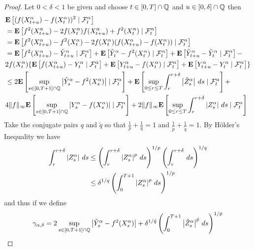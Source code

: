 \begin{proof}
Let $0 < \delta < 1$ be given and choose $t \in [0,T] \cap \rationals$ and $u \in [0,\delta] \cap \rationals$ then
\begin{align*}
&\cexpectationlong{\mathcal{F}^\alpha_t}{(f(X^\alpha_{t+u}) - f(X^\alpha_t))^2} \\
&=\cexpectationlong{\mathcal{F}^\alpha_t}{f^2(X^\alpha_{t+u}) -2 f(X^\alpha_t) f(X^\alpha_{t+u}) + f^2(X^\alpha_t)} \\
&=\cexpectationlong{\mathcal{F}^\alpha_t}{f^2(X^\alpha_{t+u}) - f^2(X^\alpha_t) -2 f(X^\alpha_t) (f(X^\alpha_{t+u}) - f(X^\alpha_t))} \\
&=\cexpectationlong{\mathcal{F}^\alpha_t}{f^2(X^\alpha_{t+u}) - \tilde{Y}^\alpha_{t+u}} +
\cexpectationlong{\mathcal{F}^\alpha_t}{\tilde{Y}^\alpha_t - f^2(X^\alpha_t) } + 
\cexpectationlong{\mathcal{F}^\alpha_t}{\tilde{Y}^\alpha_{t+u} - \tilde{Y}^\alpha_t } - \\
&2 f(X^\alpha_t) \lbrace
\cexpectationlong{\mathcal{F}^\alpha_t}{f(X^\alpha_{t+u}) - Y^\alpha_t} +
\cexpectationlong{\mathcal{F}^\alpha_t}{Y^\alpha_{t+u} - f(X^\alpha_t)} +
\cexpectationlong{\mathcal{F}^\alpha_t}{Y^\alpha_{t+u} - Y^\alpha_t} \rbrace \\
&\leq 2 \cexpectationlong{\mathcal{F}^\alpha_t}{\sup_{s \in [0,T+1] \cap \rationals} \abs{\tilde{Y}^\alpha_s - f^2(X^\alpha_s)}}  +
\cexpectationlong{\mathcal{F}^\alpha_t}{ \sup_{0 \leq r \leq T} \int_r^{r+\delta} \abs{\tilde{Z}^\alpha_s} \, ds} + \\
&4 \norm{f}_\infty \cexpectationlong{\mathcal{F}^\alpha_t}{\sup_{s \in [0,T+1] \cap \rationals} \abs{Y^\alpha_s - f(X^\alpha_s)}} +
2 \norm{f}_\infty \cexpectationlong{\mathcal{F}^\alpha_t}{ \sup_{0 \leq r \leq T} \int_r^{r+\delta} \abs{Z^\alpha_s} \, ds} 
\end{align*}
Take the conjugate pairs $q$ and $\tilde{q}$ so that $\frac{1}{p} + \frac{1}{q} = 1$ and $\frac{1}{\tilde{p}} + \frac{1}{\tilde{q}} = 1$.  By H\"{o}lder's Inequality we have
\begin{align*}
\int_r^{r+\delta} \abs{Z^\alpha_s} \, ds &\leq \left(\int_r^{r+\delta} \abs{Z^\alpha_s}^p \, ds \right)^{1/p} \left(\int_r^{r+\delta} \, ds \right)^{1/q} \\
&\leq \delta^{1/q} \left(\int_0^{T+1} \abs{Z^\alpha_s}^p \, ds \right)^{1/p}
\end{align*}
and thus if we define 
\begin{align*}
\gamma_{\alpha, \delta} = 2 \sup_{s \in [0,T+1] \cap \rationals} \abs{\tilde{Y}^\alpha_s - f^2(X^\alpha_s)} + 
\delta^{1/\tilde{q}} \left(\int_0^{T+1} \abs{\tilde{Z}^\alpha_s}^{\tilde{p}} \, ds\right)^{1/\tilde{p}} \\

\end{align*}
\end{proof}
